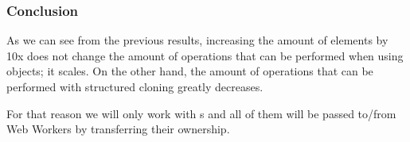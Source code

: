 \subsubsection{Conclusion}
As we can see from the previous results, increasing the amount of elements by 10x does not change the amount of operations that can be performed when using  objects; it scales. On the other hand, the amount of operations that can be performed with structured cloning greatly decreases.

For that reason we will only work with {\ttarray{}}s and all of them will be passed to/from Web Workers by transferring their ownership.

\pagebreak